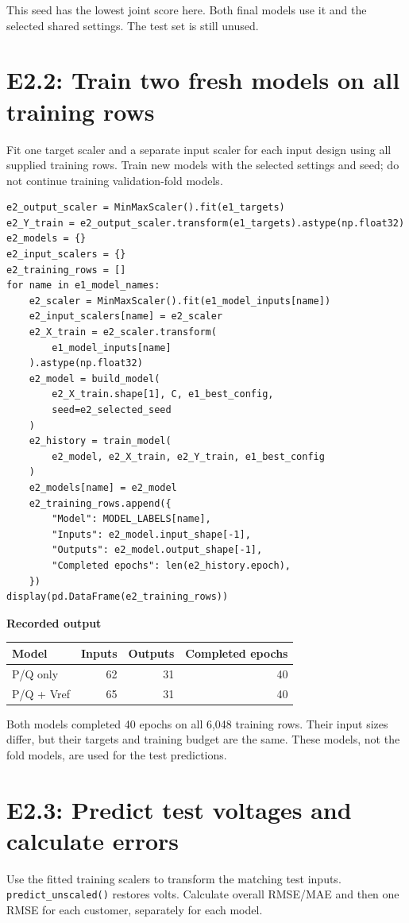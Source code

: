 \documentclass[11pt,a4paper]{article}
\begin{document}
This seed has the lowest joint score here. Both final models use it and
the selected shared settings. The test set is still unused.

\clearpage
\section*{E2.2: Train two fresh models on all training rows}
Fit one target scaler and a separate input scaler for each input design
using all supplied training rows. Train new models with the selected
settings and seed; do not continue training validation-fold models.

\begin{lstlisting}
e2_output_scaler = MinMaxScaler().fit(e1_targets)
e2_Y_train = e2_output_scaler.transform(e1_targets).astype(np.float32)
e2_models = {}
e2_input_scalers = {}
e2_training_rows = []
for name in e1_model_names:
    e2_scaler = MinMaxScaler().fit(e1_model_inputs[name])
    e2_input_scalers[name] = e2_scaler
    e2_X_train = e2_scaler.transform(
        e1_model_inputs[name]
    ).astype(np.float32)
    e2_model = build_model(
        e2_X_train.shape[1], C, e1_best_config,
        seed=e2_selected_seed
    )
    e2_history = train_model(
        e2_model, e2_X_train, e2_Y_train, e1_best_config
    )
    e2_models[name] = e2_model
    e2_training_rows.append({
        "Model": MODEL_LABELS[name],
        "Inputs": e2_model.input_shape[-1],
        "Outputs": e2_model.output_shape[-1],
        "Completed epochs": len(e2_history.epoch),
    })
display(pd.DataFrame(e2_training_rows))
\end{lstlisting}

\textbf{Recorded output}
\begin{center}
\begin{tabular}{lrrr}
\toprule
Model & Inputs & Outputs & Completed epochs \\
\midrule
P/Q only & 62 & 31 & 40 \\
P/Q + Vref & 65 & 31 & 40 \\
\bottomrule
\end{tabular}
\end{center}
Both models completed 40 epochs on all 6,048 training rows.
Their input sizes differ, but their targets and training budget are the same.
These models, not the fold models, are used for the test predictions.

\clearpage
\section*{E2.3: Predict test voltages and calculate errors}
Use the fitted training scalers to transform the matching test inputs.
\texttt{predict\_unscaled()} restores volts. Calculate overall RMSE/MAE
and then one RMSE for each customer, separately for each model.
\end{document}

